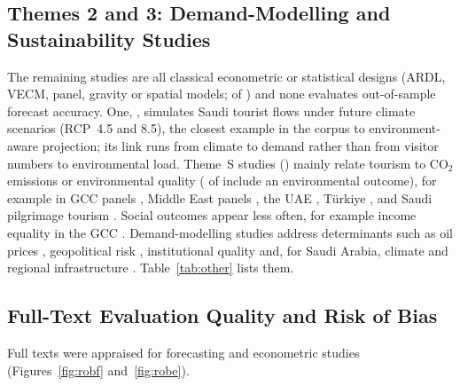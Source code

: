 \documentclass[11pt,a4paper]{article}
\begin{document}
\begin{landscape}
\begin{table}[p]
\centering\small
\caption{Forecasting studies (Theme F). ``Benchmark'': named comparison of models or benchmarks in the abstract; ``n/r'': not reported or abstract unavailable. Coded from abstracts and metadata only.}\label{tab:forecast}

\end{table}
\end{landscape}

\subsection{Themes 2 and 3: Demand-Modelling and Sustainability Studies}
The remaining \NnonFn{} studies are all classical econometric or statistical designs (ARDL, VECM, panel, gravity or spatial models; \NnonFecon{} of \NnonFn{}) and none evaluates out-of-sample forecast accuracy. One, \citet{Chouari2025}, simulates Saudi tourist flows under future climate scenarios (RCP~4.5 and 8.5), the closest example in the corpus to environment-aware projection; its link runs from climate to demand rather than from visitor numbers to environmental load. Theme~S studies (\NnS{}) mainly relate tourism to CO$_2$ emissions or environmental quality (\NSenv{} of \NnS{} include an environmental outcome), for example in GCC panels \citep{Farooq2023a,Zmami2024}, Middle East panels \citep{Voumik2023,BinSurayhid2026}, the UAE \citep{Majumdar2022}, T\"urkiye \citep{Bahar2023}, and Saudi pilgrimage tourism \citep{Naseem2025,Raihan2025}. Social outcomes appear less often, for example income equality in the GCC \citep{Alnafisah2025}. Demand-modelling studies address determinants such as oil prices \citep{Kisswani2020,Mabrouk2026}, geopolitical risk \citep{Hamida2025}, institutional quality \citep{Wada2021} and, for Saudi Arabia, climate \citep{Chouari2025,Abuhulaibah2026} and regional infrastructure \citep{Alfehaid2026}. Table~\ref{tab:other} lists them.

\begin{landscape}
\begin{table}[p]
\centering\small
\caption{Demand-modelling (D) and sustainability (S) studies. All are econometric or statistical; none evaluates out-of-sample forecast accuracy (one simulates climate scenarios).}\label{tab:other}

\end{table}
\end{landscape}

\subsection{Full-Text Evaluation Quality and Risk of Bias}\label{sec:rob}
Full texts were appraised for \NftF{} forecasting and \NftE{} econometric studies (Figures~\ref{fig:robf} and~\ref{fig:robe}).
\end{document}
